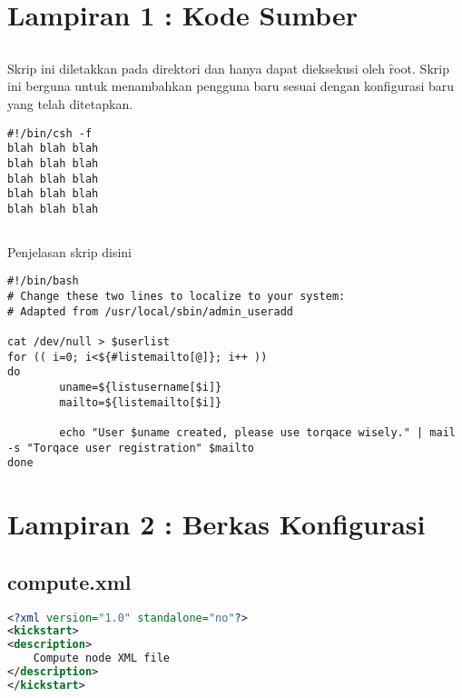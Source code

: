 \chapter*{Lampiran 1 : Kode Sumber}
\section*{} \label{cha:lampir-admin}
Skrip ini diletakkan pada direktori  dan hanya dapat dieksekusi oleh \f{root}. Skrip ini berguna untuk menambahkan pengguna baru sesuai dengan konfigurasi baru yang telah ditetapkan.
\begin{lstlisting}[style=L,caption={Skrip menambahkan pengguna baru},label={lst:adduser}]
#!/bin/csh -f
blah blah blah
blah blah blah
blah blah blah
blah blah blah
blah blah blah
\end{lstlisting}

\section*{} \label{cha:lampir-cronadmin}
Penjelasan skrip disini
\begin{lstlisting}[style=L,caption={\f{Cronjob} menambahkan pengguna baru},label={lst:cronadduser}]
#!/bin/bash
# Change these two lines to localize to your system:
# Adapted from /usr/local/sbin/admin_useradd

cat /dev/null > $userlist
for (( i=0; i<${#listemailto[@]}; i++ ))
do
        uname=${listusername[$i]}
        mailto=${listemailto[$i]}

        echo "User $uname created, please use torqace wisely." | mail -s "Torqace user registration" $mailto
done

\end{lstlisting}

\chapter*{Lampiran 2 : Berkas Konfigurasi}
\section*{compute.xml}
\begin{lstlisting}[caption={Berkas \co{compute.xml}},label={lst:excomp},language=XML]
<?xml version="1.0" standalone="no"?>
<kickstart>
<description>
	Compute node XML file
</description>
</kickstart> 
\end{lstlisting}

